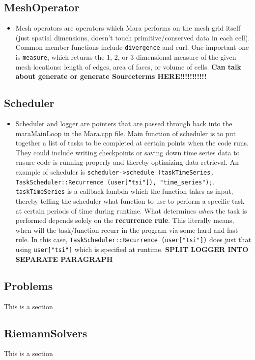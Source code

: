 \documentclass{article}
\begin{document}
\subsection{MeshOperator}
\begin{itemize}
	\item Mesh operators are operators which Mara performs on the mesh grid itself (just spatial dimensions, doesn't touch primitive/conserved data in each cell). Common member functions include \texttt{divergence} and {curl}. One important one is \texttt{measure}, which returns the 1, 2, or 3 dimensional measure of the given mesh locations: length of edges, area of faces, or volume of cells. \textbf{ Can talk about generate or generate Sourceterms HERE!!!!!!!!!!!}
\end{itemize}

\subsection{Scheduler}
\begin{itemize}
	\item Scheduler and logger are pointers that are passed through back into the maraMainLoop in the Mara.cpp file. Main function of scheduler is to put together a list of tasks to be completed at certain points when the code runs. They could include writing checkpoints or saving down time series data to ensure code is running properly and thereby optimizing data retrieval. An example of scheduler is \texttt{scheduler->schedule (taskTimeSeries, TaskScheduler::Recurrence (user["tsi"]), "time\_series");}. \texttt{taskTimeSeries} is a callback lambda which the function takes as input, thereby telling the scheduler what function to use to perform a specific task at certain periods of time during runtime. What determines \emph{when} the task is performed depends solely on the \textbf{recurrence rule}. This literally means, when will the task/function recurr in the program via some hard and fast rule. In this case, \texttt{TaskScheduler::Recurrence (user["tsi"])} does just that using \texttt{user["tsi"]} which is specified at runtime. \textbf{SPLIT LOGGER INTO SEPARATE PARAGRAPH}
\end{itemize}


\subsection{Problems}
This is a section 

\subsection{RiemannSolvers}
This is a section 
\end{document}
